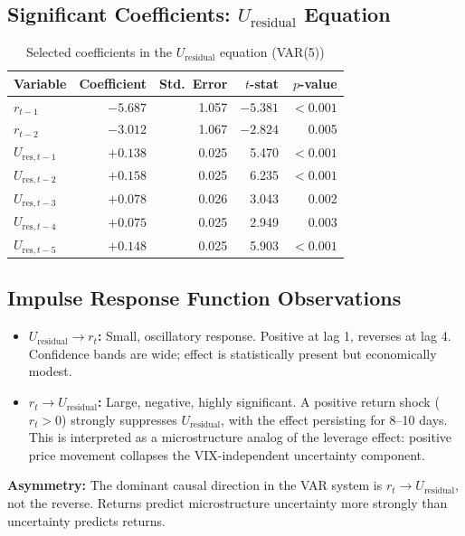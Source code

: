 \documentclass[11pt]{article}
\begin{document}
\subsection{Significant Coefficients: \texorpdfstring{$U_\mathrm{residual}$}{U\_residual} Equation}

\begin{table}[htbp]
\centering
\caption{Selected coefficients in the $U_\mathrm{residual}$ equation (VAR(5))}
\begin{tabular}{lrrrr}
\toprule
Variable & Coefficient & Std.\ Error & $t$-stat & $p$-value \\
\midrule
$r_{t-1}$ & $-5.687$ & 1.057 & $-5.381$ & $<0.001$ \\
$r_{t-2}$ & $-3.012$ & 1.067 & $-2.824$ & 0.005 \\
$U_{\mathrm{res}, t-1}$ & $+0.138$ & 0.025 & 5.470 & $<0.001$ \\
$U_{\mathrm{res}, t-2}$ & $+0.158$ & 0.025 & 6.235 & $<0.001$ \\
$U_{\mathrm{res}, t-3}$ & $+0.078$ & 0.026 & 3.043 & 0.002 \\
$U_{\mathrm{res}, t-4}$ & $+0.075$ & 0.025 & 2.949 & 0.003 \\
$U_{\mathrm{res}, t-5}$ & $+0.148$ & 0.025 & 5.903 & $<0.001$ \\
\bottomrule
\end{tabular}
\end{table}

\subsection{Impulse Response Function Observations}

\begin{itemize}
    \item \textbf{$U_\mathrm{residual} \to r_t$:} Small, oscillatory response. Positive at lag 1, reverses at lag 4. Confidence bands are wide; effect is statistically present but economically modest.
    \item \textbf{$r_t \to U_\mathrm{residual}$:} Large, negative, highly significant. A positive return shock ($r_t > 0$) strongly suppresses $U_\mathrm{residual}$, with the effect persisting for 8--10 days. This is interpreted as a microstructure analog of the leverage effect: positive price movement collapses the VIX-independent uncertainty component.
\end{itemize}

\textbf{Asymmetry:} The dominant causal direction in the VAR system is $r_t \to U_\mathrm{residual}$, not the reverse. Returns predict microstructure uncertainty more strongly than uncertainty predicts returns.
\end{document}
